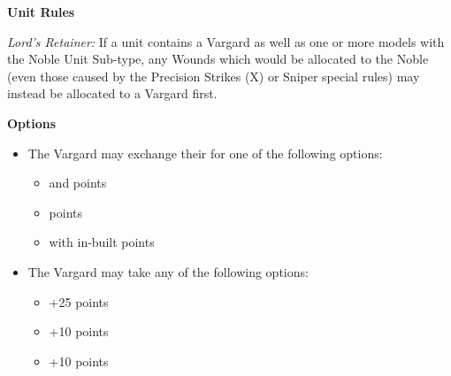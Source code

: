 \begin{minipage}[t]{0.72\textwidth}
	\vspace*{2em}
	\textbf{Unit Rules}
	
	\textit{Lord's Retainer:} If a unit contains a Vargard as well as one or more models with the Noble Unit Sub-type, any Wounds which would be allocated to the Noble (even those caused by the Precision Strikes (X) or Sniper special rules) may instead	be allocated to a Vargard first.

	\vspace*{2em}
	\textbf{Options}
	\begin{itemize}
		\item The Vargard may exchange their  for one of the following options:
		\begin{itemize}			
			\item {} and   points
			\item {}  points
			\item {} with in-built   points
		\end{itemize}
		\item The Vargard may take any of the following options:
		\begin{itemize}
			\item {} \dotfill +25 points
			\item {} \dotfill +10 points
			\item {} \dotfill +10 points
		\end{itemize}
	\end{itemize}
\end{minipage}


\newpage
\subsubsection[Cryptek Conclave]{}

